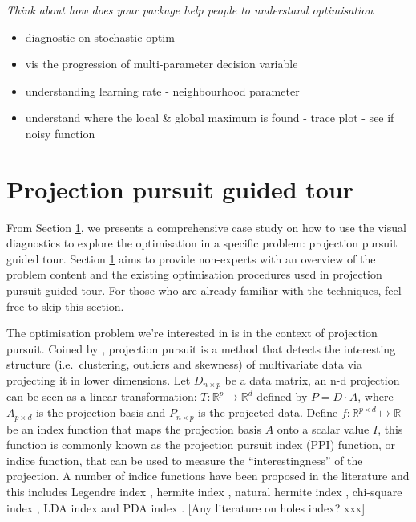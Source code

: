 \documentclass[12pt]{article}
\providecommand{\tightlist}{%
  \setlength{\itemsep}{0pt}\setlength{\parskip}{0pt}}
\begin{document}
\emph{Think about how does your package help people to understand
optimisation}

\begin{itemize}
\tightlist
\item
  diagnostic on stochastic optim
\item
  vis the progression of multi-parameter decision variable
\item
  understanding learning rate - neighbourhood parameter
\item
  understand where the local \& global maximum is found - trace plot -
  see if noisy function
\end{itemize}

\hypertarget{tour}{%
\section{Projection pursuit guided tour}\label{tour}}

From Section \ref{tour}, we presents a comprehensive case study on how
to use the visual diagnostics to explore the optimisation in a specific
problem: projection pursuit guided tour. Section \ref{tour} aims to
provide non-experts with an overview of the problem content and the
existing optimisation procedures used in projection pursuit guided tour.
For those who are already familiar with the techniques, feel free to
skip this section.

The optimisation problem we're interested in is in the context of
projection pursuit. Coined by \citet{friedman1974projection}, projection
pursuit is a method that detects the interesting structure
(i.e.~clustering, outliers and skewness) of multivariate data via
projecting it in lower dimensions. Let \(D_{n \times p}\) be a data
matrix, an n-d projection can be seen as a linear transformation:
\(T: \mathbb{R}^p \mapsto \mathbb{R}^d\) defined by \(P = D \cdot A\),
where \(A_{p\times d}\) is the projection basis and \(P_{n \times p}\)
is the projected data. Define
\(f: \mathbb{R}^{p \times d} \mapsto \mathbb{R}\) be an index function
that maps the projection basis \(A\) onto a scalar value \(I\), this
function is commonly known as the projection pursuit index (PPI)
function, or indice function, that can be used to measure the
``interestingness'' of the projection. A number of indice functions have
been proposed in the literature and this includes Legendre index
\citep{friedman1974projection}, hermite index
\citep{hall1989polynomial}, natural hermite index
\citep{cook1993projection}, chi-square index
\citep{posse1995projection}, LDA index \citep{lee2005projection} and PDA
index \citep{lee2010projection}. {[}Any literature on holes index?
xxx{]}
\end{document}
